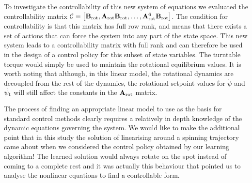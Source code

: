 To investigate the controllability of this new system of equations we evaluated the controllability matrix $\mathcal{C} = \big[\mathbf{B}_{\text{rot}}, \mathbf{A}_{\text{rot}}\mathbf{B}_{\text{rot}}, \dots, \mathbf{A}_{\text{rot}}^{6}\mathbf{B}_{\text{rot}}\big]$. The condition for controllability is that this matrix has full row rank, and means that there exists a set of actions that can force the system into any part of the state space. This new system leads to a controllability matrix with full rank and can therefore be used in the design of a control policy for this subset of state variables. The turntable torque would simply be used to maintain the rotational equilibrium values. It is worth noting that although, in this linear model, the rotational dynamics are decoupled from the rest of the dynamics, the rotational setpoint values for $\dot\psi$ and $\dot\psi_{\text{t}}$ will still affect the constants in the $\mathbf{A}_{\text{rot}}$ matrix.




%


The process of finding an appropriate linear model to use as the basis for standard control methods clearly requires a relatively in depth knowledge of the dynamic equations governing the system. We would like to make the additional point that in this study the solution of linearising around a spinning trajectory came about when we considered the control policy obtained by our learning algorithm! The learned solution would always rotate on the spot instead of coming to a complete rest and it was actually this behaviour that pointed us to analyse the nonlinear equations to find a controllable form.


